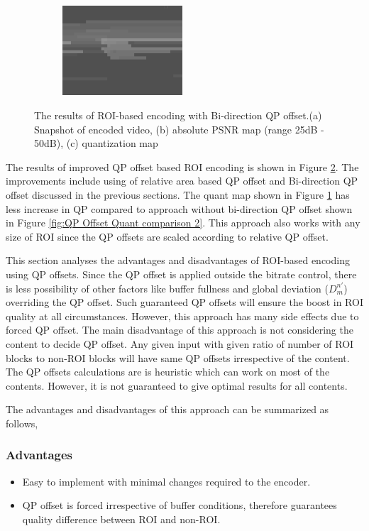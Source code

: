 \documentclass[11pt]{article} %
\begin{document}
\begin{figure}
\begin{subfigure}[t]{\textwidth}
	\centering
	\includegraphics[width=0.49\textwidth]{QPOffset/Bi_direction/Paul250kbps_uni_QP_offset_Bi_4_quant.png}
	\caption{}
	\label{fig:Bi-direction QP offset result quant}
	\end{subfigure}
	\caption{The results of ROI-based encoding with Bi-direction QP offset.(a) Snapshot of encoded video, (b) absolute PSNR map (range 25dB - 50dB), (c) quantization map}
	\label{fig:Bi-direction QP offset result}
\end{figure}

The results of improved QP offset based ROI encoding is shown in Figure \ref{fig:Bi-direction QP offset result}. The improvements include using of relative area based QP offset and Bi-direction QP offset discussed in the previous sections. The quant map shown in Figure \ref{fig:Bi-direction QP offset result quant} has less increase in QP compared to approach without bi-direction QP offset shown in Figure \ref{fig:QP Offset Quant comparison 2}. This approach also works with any size of ROI since the QP offsets are scaled according to relative QP offset.
 
This section analyses the advantages and disadvantages of ROI-based encoding using QP offsets. Since the QP offset is applied outside the bitrate control, there is less possibility of other factors like buffer fullness and global deviation ($D_m^{n'}$) overriding the QP offset. Such guaranteed QP offsets will ensure the boost in ROI quality at all circumstances. However, this approach has many side effects due to forced QP offset. The main disadvantage of this approach is not considering the content to decide QP offset. Any given input with given ratio of number of ROI blocks to non-ROI blocks will have same QP offsets irrespective of the content. The QP offsets calculations are is heuristic which can work on most of the contents. However, it is not guaranteed to give optimal results for all contents.

The advantages and disadvantages of this approach can be summarized as follows,
\subsubsection*{Advantages}
\begin{itemize}
	\item Easy to implement with minimal changes required to the encoder.
	\item QP offset is forced irrespective of buffer conditions, therefore guarantees quality difference between ROI and non-ROI.
\end{itemize}
\end{document}
